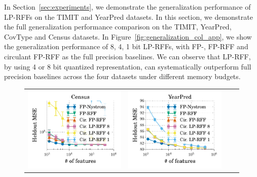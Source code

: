 In Section~\ref{sec:experiments}, we demonstrate the generalization performance of LP-RFFs on the TIMIT and YearPred datasets. In this section, we demonstrate the full generalization performance comparison on the TIMIT, YearPred, CovType and Census datasets. In Figure~\ref{fig:generalization_col_app}, we show the generalization performance of 8, 4, 1 bit LP-RFFs, with FP-\Nystrom, FP-RFF and circulant FP-RFF as the full precision baselines. We can observe that LP-RFF, by using 4 or 8 bit quantized representation, can systematically outperform full precision baselines across the four datasets under different memory budgets.
\begin{figure}
	\centering
	\begin{tabular}{@{\hskip 0in}c@{\hskip 0in}c@{\hskip 0in}c@{\hskip 0in}c@{\hskip 0in}}
		\includegraphics[width=0.26\linewidth]{figures/census_MSE_vs_n_feat_all_line.pdf} &
		\includegraphics[width=0.26\linewidth]{figures/yearpred_MSE_vs_n_feat_all_line.pdf} &

\end{tabular}
\end{figure}

